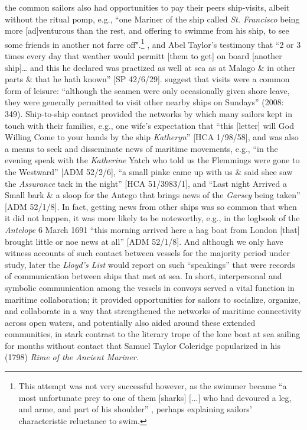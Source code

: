 the common sailors also had opportunities to pay their peers ship-visits, albeit without the ritual pomp, e.g., “one Mariner of the ship called \textit{St. Francisco} being more [ad]venturous than the rest, and offering to swimme from his ship, to see some friends in another not farre off".\footnote{This attempt was not very successful however, as the swimmer became “a most unfortunate prey to one of them [sharks] [...] who had devoured a leg, and arme, and part of his shoulder” \citep[21]{Gage1648}, perhaps explaining sailors’ characteristic reluctance to swim.} \citep[21]{Gage1648}, and Abel Taylor’s testimony that “2 or 3 times every day that weather would permitt [them to get] on board [another ship]… and this he declared was practized as well at sea as at Malago \& in other parts \& that he hath known” [SP 42/6/29]. \citeauthor{AdkinsAdkins2008} suggest that  visits were a common form of leisure: “although the seamen were only occasionally given shore leave, they were generally permitted to visit other nearby ships on Sundays” (2008: 349). Ship-to-ship contact provided the networks by which many sailors kept in touch with their families, e.g., one wife’s expectation that “this [letter] will God Willing Come to your hands by the ship \textit{Katheryn}” [HCA 1/98/58], and was also a means to seek and disseminate news of maritime movements, e.g., “in the evening speak with the \textit{Katherine} Yatch who told us the Flemmings were gone to the Westward” [ADM 52/2/6], “a small pinke came up with us \& said shee saw the \textit{Assurance} tack in the night” [HCA 51/3983/1], and “Last night Arrived a Small bark \& a sloop for the Antego that brings news of the \textit{Garsey} being taken” [ADM 52/1/8]. In fact, getting news from other ships was so common that when it did not happen, it was more likely to be noteworthy, e.g., in the logbook of the \textit{Antelope} 6 March {1691} “this morning arrived here a hag boat from London [that] brought little or noe news at all” [ADM 52/1/8]. And although we only have witness accounts of such contact between vessels for the majority period under study, later the \textit{Lloyd's List} would report on such “speakings” that were records of communication between ships that met at sea. In short, interpersonal and symbolic communication among the vessels in convoys served a vital function in maritime collaboration; it provided opportunities for sailors to socialize, organize, and collaborate in a way that strengthened the networks of maritime connectivity across open waters, and potentially also aided  around these extended communities, in stark contrast to the literary trope of the lone boat at sea sailing for months without contact that Samuel Taylor Coleridge popularized in his (1798) \textit{Rime of the Ancient Mariner.} 

